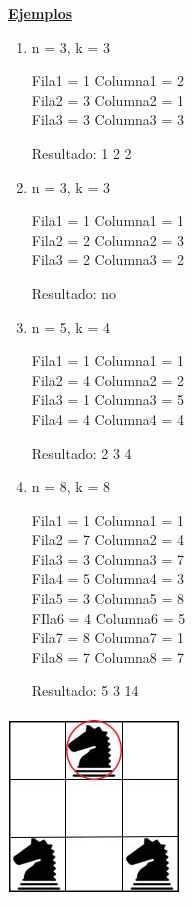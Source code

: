 \documentclass[10pt,a4paper]{article}
\begin{document}
\noindent \underline{\textbf{Ejemplos}}
\begin{multicols}{2}
\begin{enumerate}[leftmargin=0.5cm]
\item n = 3, k = 3

Fila1 = 1 Columna1 = 2\\
Fila2 = 3 Columna2 = 1\\
Fila3 = 3 Columna3 = 3

Resultado: 1 2 2

\item n = 3, k = 3

Fila1 = 1 Columna1 = 1\\
Fila2 = 2 Columna2 = 3\\
Fila3 = 2 Columna3 = 2

Resultado: no

\item n = 5, k = 4

Fila1 = 1 Columna1 = 1\\
Fila2 = 4 Columna2 = 2\\
Fila3 = 1 Columna3 = 5\\
Fila4 = 4 Columna4 = 4

Resultado: 2 3 4

\item n = 8, k = 8

Fila1 = 1 Columna1 = 1\\
Fila2 = 7 Columna2 = 4\\
Fila3 = 3 Columna3 = 7\\
Fila4 = 5 Columna4 = 3\\
Fila5 = 3 Columna5 = 8\\
FIla6 = 4 Columna6 = 5\\
Fila7 = 8 Columna7 = 1\\
Fila8 = 7 Columna8 = 7

Resultado: 5 3 14
\end{enumerate}

\columnbreak

\includegraphics[scale=0.20]{img/knight3x3_1.jpg}\\\\\\


\end{multicols}
\end{document}
